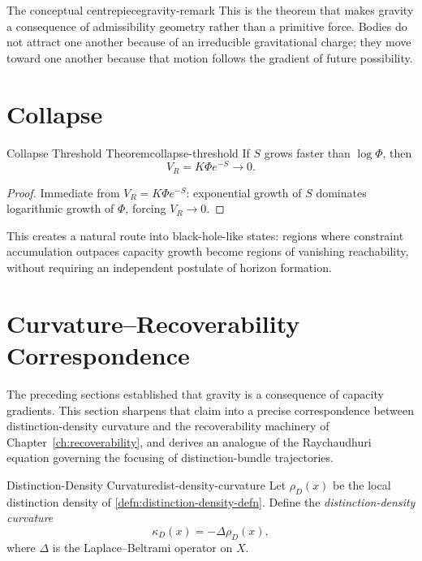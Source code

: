 \documentclass[12pt,twoside,openright]{book}
\begin{document}
\begin{remark}{The conceptual centrepiece}{gravity-remark}
  This is the theorem that makes gravity a consequence of
  admissibility geometry rather than a primitive force.
  Bodies do not attract one another because of an
  irreducible gravitational charge; they move toward one
  another because that motion follows the gradient of
  future possibility.
\end{remark}

\section{Collapse}
\label{sec:ch17-collapse}

\begin{theorem}{Collapse Threshold Theorem}{collapse-threshold}
  If $S$ grows faster than $\log\Phi$, then
  \[
    V_R = K\Phi e^{-S} \to 0.
  \]
\end{theorem}

\begin{proof}
  Immediate from $V_R = K\Phi e^{-S}$: exponential growth
  of $S$ dominates logarithmic growth of $\Phi$, forcing
  $V_R \to 0$.
\end{proof}

This creates a natural route into black-hole-like states:
regions where constraint accumulation outpaces capacity
growth become regions of vanishing reachability, without
requiring an independent postulate of horizon formation.

\section{Curvature--Recoverability Correspondence}
\label{sec:ch17-curv-reco}

The preceding sections established that gravity is a
consequence of capacity gradients. This section sharpens
that claim into a precise correspondence between
distinction-density curvature and the recoverability
machinery of Chapter~\ref{ch:recoverability}, and derives
an analogue of the Raychaudhuri equation governing the
focusing of distinction-bundle trajectories.

\begin{definition}{Distinction-Density Curvature}{dist-density-curvature}
  Let $\rho_D(x)$ be the local distinction density of
  \cref{defn:distinction-density-defn}. Define the
  \emph{distinction-density curvature}
  \[
    \kappa_D(x) = -\Delta\rho_D(x),
  \]
  where $\Delta$ is the Laplace--Beltrami operator on $X$.
\end{definition}
\end{document}
